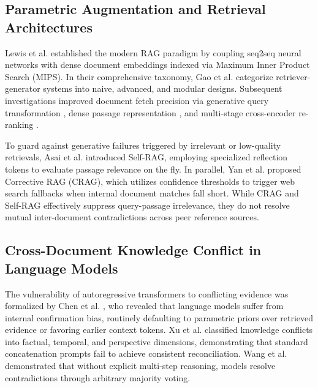 \documentclass[conference]{IEEEtran}
\begin{document}
\subsection{Parametric Augmentation and Retrieval Architectures}
Lewis et al. \cite{lewis2020retrieval} established the modern RAG paradigm by coupling seq2seq neural networks with dense document embeddings indexed via Maximum Inner Product Search (MIPS). In their comprehensive taxonomy, Gao et al. \cite{gao2023retrieval} categorize retriever-generator systems into naive, advanced, and modular designs. Subsequent investigations improved document fetch precision via generative query transformation \cite{jagerman2023query}, dense passage representation \cite{karpukhin2020dense}, and multi-stage cross-encoder re-ranking \cite{nogueira2019passage}.

To guard against generative failures triggered by irrelevant or low-quality retrievals, Asai et al. \cite{asai2023self} introduced Self-RAG, employing specialized reflection tokens to evaluate passage relevance on the fly. In parallel, Yan et al. \cite{yan2024corrective} proposed Corrective RAG (CRAG), which utilizes confidence thresholds to trigger web search fallbacks when internal document matches fall short. While CRAG and Self-RAG effectively suppress query-passage irrelevance, they do not resolve mutual inter-document contradictions across peer reference sources.

\subsection{Cross-Document Knowledge Conflict in Language Models}
The vulnerability of autoregressive transformers to conflicting evidence was formalized by Chen et al. \cite{chen2023understanding}, who revealed that language models suffer from internal confirmation bias, routinely defaulting to parametric priors over retrieved evidence or favoring earlier context tokens. Xu et al. \cite{xu2024knowledge} classified knowledge conflicts into factual, temporal, and perspective dimensions, demonstrating that standard concatenation prompts fail to achieve consistent reconciliation. Wang et al. \cite{wang2023resolving} demonstrated that without explicit multi-step reasoning, models resolve contradictions through arbitrary majority voting.
\end{document}
